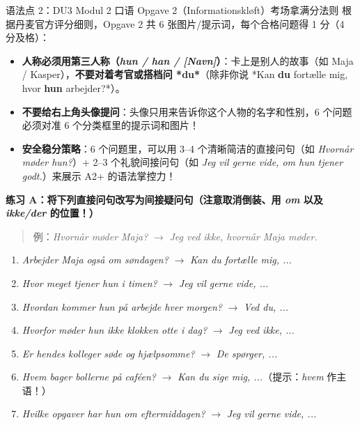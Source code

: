 \begin{grammatikbox}{语法点 2：DU3 Modul 2 口语 Opgave 2（Informationskløft）考场拿满分法则}
根据丹麦官方评分细则，Opgave 2 共 6 张图片/提示词，每个合格问题得 1 分（4 分及格）：
\begin{itemize}
  \item \textbf{人称必须用第三人称（\textit{hun / han / [Navn]}）}：卡上是别人的故事（如 Maja / Kasper），\textbf{不要对着考官或搭档问 *du*}（除非你说 *Kan \textbf{du} fortælle mig, hvor \textbf{hun} arbejder?*）。
  \item \textbf{不要给右上角头像提问}：头像只用来告诉你这个人物的名字和性别，6 个问题必须对准 6 个分类框里的提示词和图片！
  \item \textbf{安全稳分策略}：6 个问题里，可以用 3--4 个清晰简洁的直接问句（如 \textit{Hvornår møder hun?}）+ 2--3 个礼貌间接问句（如 \textit{Jeg vil gerne vide, om hun tjener godt.}）来展示 A2+ 的语法掌控力！
\end{itemize}
\end{grammatikbox}


\textbf{练习 A：将下列直接问句改写为间接疑问句（注意取消倒装、用 \textit{om} 以及 \textit{ikke/der} 的位置！）}
\begin{quote}
\small 例：\textit{Hvornår møder Maja?} $\rightarrow$ \textit{Jeg ved ikke, hvornår Maja møder.}
\end{quote}
\begin{enumerate}
  \item \textit{Arbejder Maja også om søndagen?} $\rightarrow$ \textit{Kan du fortælle mig, ...}
  \item \textit{Hvor meget tjener hun i timen?} $\rightarrow$ \textit{Jeg vil gerne vide, ...}
  \item \textit{Hvordan kommer hun på arbejde hver morgen?} $\rightarrow$ \textit{Ved du, ...}
  \item \textit{Hvorfor møder hun ikke klokken otte i dag?} $\rightarrow$ \textit{Jeg ved ikke, ...}
  \item \textit{Er hendes kolleger søde og hjælpsomme?} $\rightarrow$ \textit{De spørger, ...}
  \item \textit{Hvem bager bollerne på caféen?} $\rightarrow$ \textit{Kan du sige mig, ...}（提示：\textit{hvem} 作主语！）
  \item \textit{Hvilke opgaver har hun om eftermiddagen?} $\rightarrow$ \textit{Jeg vil gerne vide, ...}
\end{enumerate}

